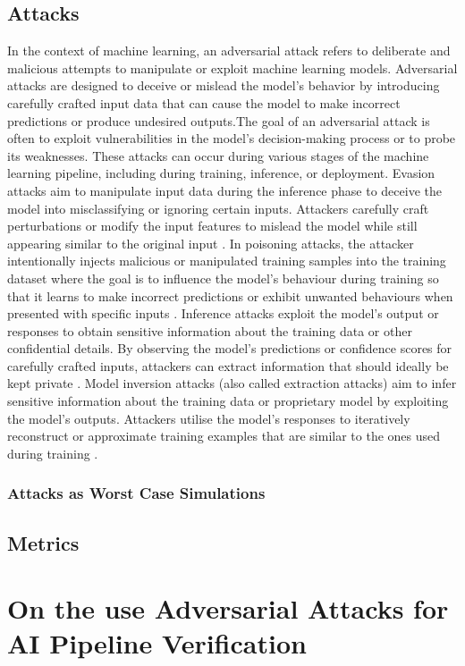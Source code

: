 \subsection{Attacks}
\label{subsec:methods-attacks}
In the context of machine learning, an adversarial attack refers to deliberate and malicious attempts to manipulate or exploit machine learning models. Adversarial attacks are designed to deceive or mislead the model's behavior by introducing carefully crafted input data that can cause the model to make incorrect predictions or produce undesired outputs.The goal of an adversarial attack is often to exploit vulnerabilities in the model's decision-making process or to probe its weaknesses. 
These attacks can occur during various stages of the machine learning pipeline, including during training, inference, or deployment. 
Evasion attacks aim to manipulate input data during the inference phase to deceive the model into misclassifying or ignoring certain inputs. 
Attackers carefully craft perturbations or modify the input features to mislead the model while still appearing similar to the original input \cite{biggio_evasion_2013,carlini_towards_2017,adversarialpatch,pixelattack,hopskipjump}. 
In poisoning attacks, the attacker intentionally injects malicious or manipulated training samples into the training dataset where the goal is to influence the model's behaviour during training so that it learns to make incorrect predictions or exhibit unwanted behaviours when presented with specific inputs \cite{biggio_poisoning_2013, saha2020hidden}. 
Inference attacks exploit the model's output or responses to obtain sensitive information about the training data or other confidential details. By observing the model's predictions or confidence scores for carefully crafted inputs, attackers can extract information that should ideally be kept private \cite{chakraborty_adversarial_2018, orekondy2019knockoff}.
Model inversion attacks (also called extraction attacks) aim to infer sensitive information about the training data or proprietary model by exploiting the model's outputs. Attackers utilise the model's responses to iteratively reconstruct or approximate training examples that are similar to the ones used during training \cite{chakraborty_adversarial_2018, choquette2021label, li2021membership}.

\subsubsection{Attacks as Worst Case Simulations}
\lipsum[1]
\subsection{Metrics}
\label{subsec:methods-metrics}
\lipsum[1-3]
\section{On the use Adversarial Attacks for AI Pipeline Verification }








